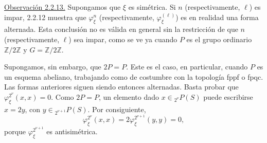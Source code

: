 
\medskip
\noindent\underline{Observación 2.2.13.}
Supongamos que $\xi$ es simétrica. Si $n$ (respectivamente, $\ell$) es
impar, 2.2.12 muestra que $\varphi^n_\xi$ (respectivamente,
$\varphi^{(\ell)}_\xi$) es en realidad una forma alternada. Esta
conclusión no es válida en general sin la restricción de que $n$
(respectivamente, $\ell$) sea impar, como se ve ya cuando $P$ es el
grupo ordinario $\mathbb Z/2\mathbb Z$ y $G=\mathbb Z/2\mathbb Z$.

Supongamos, sin embargo, que $2P=P$. Este es el caso, en particular,
cuando $P$ es un esquema abeliano, trabajando como de costumbre con la
topología fppf o fpqc. Las formas anteriores siguen siendo entonces
alternadas. Basta probar que $\varphi^{2^\nu}_\xi(x,x)=0$. Como
$2P=P$, un elemento dado $x\in{}_{2^\nu}P(S)$ puede escribirse
$x=2y$, con $y\in{}_{2^{\nu+1}}P(S)$. Por consiguiente,
\[
 \varphi^{2^\nu}_\xi(x,x)
 =2\varphi^{2^{\nu+1}}_\xi(y,y)=0,
\]
porque $\varphi^{2^{\nu+1}}_\xi$ es antisimétrica.
